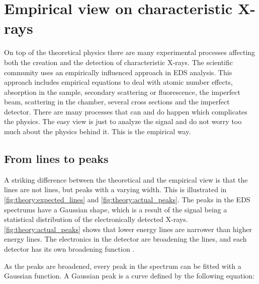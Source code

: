 \section{Empirical view on characteristic X-rays}
\label{sec:theory:empirical}
On top of the theoretical physics there are many experimental processes affecting both the creation and the detection of characteristic X-rays.
The scientific community uses an empirically influenced approach in EDS analysis.
This approach includes empirical equations to deal with atomic number effects, absorption in the sample, secondary scattering or fluorescence, the imperfect beam, scattering in the chamber, several cross sections and the imperfect detector.
There are many processes that can and do happen which complicates the physics.
The easy view is just to analyze the signal and do not worry too much about the physics behind it.
This is the empirical way.


%
%
\subsection{From lines to peaks}
\label{sec:theory:empirical:peaks}
A striking difference between the theoretical and the empirical view is that the lines are not lines, but peaks with a varying width.
This is illustrated in \cref{fig:theory:expected_lines} and \cref{fig:theory:actual_peaks}.
The peaks in the EDS spectrums have a Gaussian shape, which is a result of the signal being a statistical distribution of the electronically detected X-rays.
\cref{fig:theory:actual_peaks} shows that lower energy lines are narrower than higher energy lines.
The electronics in the detector are broadening the lines, and each detector has its own broadening function \cite{broadening_broduscha}.

As the peaks are broadened, every peak in the spectrum can be fitted with a Gaussian function.
A Gaussian peak is a curve defined by the following equation:

